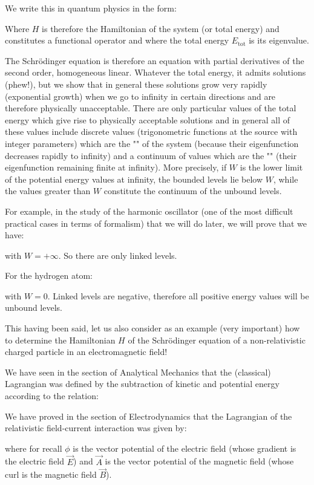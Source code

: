 	We write this in quantum physics in the form:
	
	Where $H$ is therefore the Hamiltonian of the system (or total energy) and constitutes a functional operator and where the total energy $E_\text{tot}$ is its eigenvalue.
	
	The Schrödinger equation is therefore an equation with partial derivatives of the second order, homogeneous linear. Whatever the total energy, it admits solutions (phew!), but we show that in general these solutions grow very rapidly (exponential growth) when we go to infinity in certain directions and are therefore physically unacceptable. There are only particular values of the total energy which give rise to physically acceptable solutions and in general all of these values include discrete values (trigonometric functions at the source with integer parameters) which are the "" of the system (because their eigenfunction decreases rapidly to infinity) and a continuum of values which are the "" (their eigenfunction remaining finite at infinity). More precisely, if $W$ is the lower limit of the potential energy values at infinity, the bounded levels lie below $W$, while the values greater than $W$ constitute the continuum of the unbound levels.

	For example, in the study of the harmonic oscillator (one of the most difficult practical cases in terms of formalism) that we will do later, we will prove that we have:
	
	with $W=+\infty$. So there are only linked levels.

	For the hydrogen atom:
	
	with $W=0$. Linked levels are negative, therefore all positive energy values will be unbound levels.
	
	This having been said, let us also consider as an example (very important) how to determine the Hamiltonian $H$ of the Schrödinger equation of a non-relativistic charged particle in an electromagnetic field!

	We have seen in the section of Analytical Mechanics that the (classical) Lagrangian was defined by the subtraction of kinetic and potential energy according to the relation:
	
	We have proved in the section of Electrodynamics that the Lagrangian of the relativistic field-current interaction was given by:
	
	where for recall $\phi$ is the vector potential of the electric field (whose gradient is the electric field $\vec{E}$) and $\vec{A}$ is the vector potential of the magnetic field (whose curl is the magnetic field $\vec{B}$).

